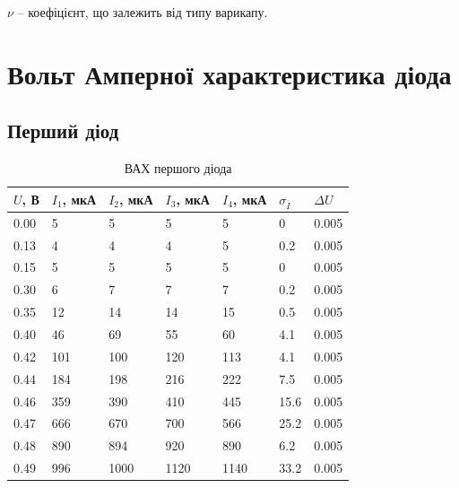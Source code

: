 \documentclass[12pt]{article}
\begin{document}
$\nu$ -- коефіцієнт, що залежить від типу варикапу.


\section{Вольт Амперної характеристика діода}

\newpage
\subsection{Перший діод}
\begin{table}[ht]
    \centering
	\caption{ВАХ першого діода}
    \begin{tabular}{lllllll}
        \hline
        $U$, В & $I_1$, мкА & $I_2$, мкА & $I_3$, мкА & $I_4$, мкА  & $\sigma_{\overline{I}}$ & $\Delta U$\\
        \hline
        0.00  & 5   & 5    & 5    & 5 & 0       & 0.005\\
        0.13  & 4   & 4    & 4    & 5 & 0.2     & 0.005\\
        0.15  & 5   & 5    & 5    & 5 & 0       & 0.005\\
        0.30  & 6   & 7    & 7    & 7 & 0.2     & 0.005\\
        0.35  & 12  & 14   & 14   & 15 & 0.5    & 0.005\\
        0.40  & 46  & 69   & 55   & 60 & 4.1    & 0.005\\
        0.42  & 101 & 100  & 120  & 113 & 4.1   & 0.005\\
        0.44  & 184 & 198  & 216  & 222 & 7.5   & 0.005\\
        0.46  & 359 & 390  & 410  & 445 & 15.6  & 0.005\\
        0.47  & 666 & 670  & 700  & 566 & 25.2  & 0.005\\
        0.48  & 890 & 894  & 920  & 890 & 6.2   & 0.005\\
        0.49  & 996 & 1000 & 1120 & 1140 & 33.2 & 0.005\\
        \hline
    \end{tabular}
\end{table}
\end{document}
